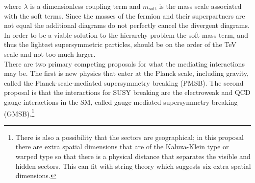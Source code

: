 where $\lambda$ is a dimensionless coupling term and $m_{\mathrm{soft}}$ is the mass scale associated with the soft terms.  Since the masses of the fermion and their superpartners are not equal the additional diagrams do not perfectly cancel the divergent diagrams.  In order to be a viable solution to the hierarchy problem the soft mass term, and thus the lightest supersymmetric particles, should be on the order of the TeV scale and not too much larger.  \\


There are two primary competing proposals for what the mediating interactions may be.  The first is new physics that enter at the Planck scale, including gravity, called the Planck-scale-mediated supersymmetry breaking (PMSB).  The second proposal is that the interactions for SUSY breaking are the electroweak and QCD gauge interactions in the SM, called gauge-mediated supersymmetry breaking (GMSB).\footnote{There is also a possibility that the sectors are geographical; in this proposal there are extra spatial dimensions that are of the Kaluza-Klein type or warped type so that there is a physical distance that separates the visible and hidden sectors.  This can fit with string theory which suggests six extra spatial dimensions.} \\ %


